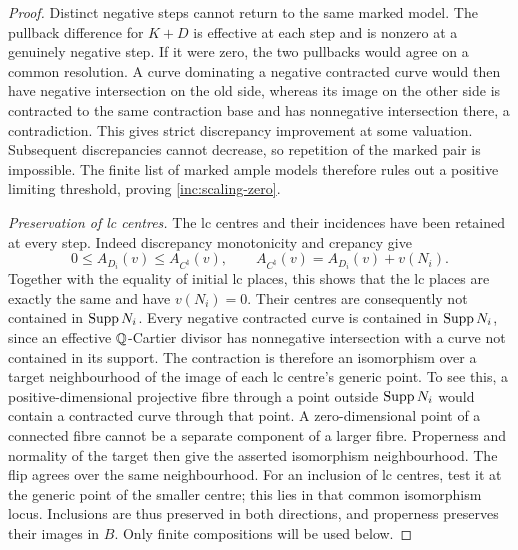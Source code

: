 \begin{proof}
Distinct negative steps cannot return to the same marked model.
The pullback difference for $K+D$ is effective at each step and is
nonzero at a genuinely negative step.  If it were zero, the two
pullbacks would agree on a common resolution.  A curve dominating a
negative contracted curve would then have negative intersection on
the old side, whereas its image on the other side is contracted to
the same contraction base and has nonnegative intersection there,
a contradiction.  This gives strict discrepancy improvement at some
valuation.  Subsequent discrepancies cannot decrease, so repetition
of the marked pair is impossible.  The finite list of marked ample
models therefore rules out a positive limiting threshold, proving
\eqref{inc:scaling-zero}.

\smallskip\noindent\emph{Preservation of lc centres.}
The lc centres and their incidences have been retained at every step.
Indeed discrepancy monotonicity and crepancy give
\[
 0\leq A_{D_i}(v)\leq A_{C^\natural}(v),
 \qquad A_{C^\natural}(v)=A_{D_i}(v)+v(N_i).
\]
Together with the equality of initial lc places, this shows that the
lc places are exactly the same and have $v(N_i)=0$.  Their centres
are consequently not contained in $\operatorname{Supp} N_i$.  Every negative
contracted curve is contained in $\operatorname{Supp} N_i$, since an effective
$\mathbb Q$-Cartier divisor has nonnegative intersection with a curve not
contained in its support.  The contraction is therefore an isomorphism
over a target neighbourhood of the image of each lc centre's generic point.
To see this, a positive-dimensional projective fibre through a point
outside $\operatorname{Supp} N_i$ would contain a contracted curve through that
point.  A zero-dimensional point of a connected fibre cannot be a
separate component of a larger fibre.  Properness and normality of
the target then give the asserted isomorphism neighbourhood.  The
flip agrees over the same neighbourhood.  For an inclusion of lc
centres, test it at the generic point of the smaller centre; this lies
in that common isomorphism locus.  Inclusions are thus preserved in
both directions, and properness preserves their images in $B$.
Only finite compositions will be used below.


\end{proof}
